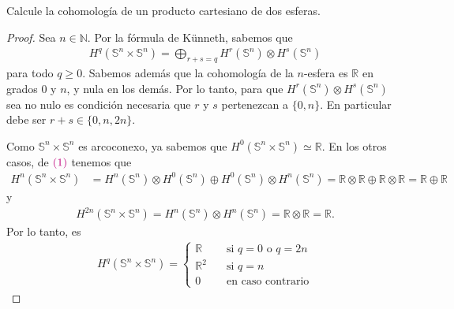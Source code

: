 \documentclass[11pt]{article}
\newcommand{\N}{\mathbb{N}}
\newcommand{\R}{\mathbb{R}}
\newcommand{\Ss}{\mathbb{S}}
\newcommand{\paint}[1]{\color{color}{#1}}
\newenvironment{exercise}[2][Ejercicio]{\begin{trivlist}
\item[\hskip \labelsep \paint{{\bfseries #1}}\hskip \labelsep {\bfseries #2.}]}{\end{trivlist}}
\begin{document}
\begin{exercise}{11 (d)} Calcule la cohomología de un producto cartesiano de dos esferas.
\begin{proof} Sea $n \in \N$. Por la fórmula de Künneth, sabemos que
\begin{align}
H^q(\Ss^n \times \Ss^n) = \bigoplus_{r+s = q} H^r(\Ss^n) \otimes H^s(\Ss^n)
\end{align}
para todo $q \geq 0$. Sabemos además que la cohomología de la $n$-esfera es $\R$ en grados $0$ y $n$, y nula en los demás. Por lo tanto, para que $H^r(\Ss^n) \otimes H^s(\Ss^n)$ sea no nulo es condición necesaria que $r$ y $s$ pertenezcan a $\{0,n\}$. En particular debe ser $r+s \in \{0,n,2n\}$. 

Como $\Ss^n \times  \Ss^n$ es arcoconexo, ya sabemos que $H^0(\Ss^n \times \Ss^n) \simeq \R$. En los otros casos, de $\paint{(1)}$ tenemos que
\begin{align*}
H^n(\Ss^n \times \Ss^n) &= H^n(\Ss^n) \otimes H^0(\Ss^n) \oplus H^0(\Ss^n) \otimes H^n(\Ss^n) = \R \otimes \R \oplus \R \otimes \R = \R \oplus \R
\end{align*}
y
\begin{align*}
H^{2n}(\Ss^n \times \Ss^n) = H^n(\Ss^n) \otimes H^n(\Ss^n) = \R \otimes \R = \R.
\end{align*}
Por lo tanto, es
\begin{align*}
H^q(\Ss^n \times \Ss^n) = \begin{cases}
\R \quad &\text{si $q = 0$ o $q = 2n$}\\
\R^2 \quad &\text{si $q = n$}\\
0 \quad &\text{en caso contrario}
\end{cases}
\end{align*}
\end{proof}
\end{exercise}
\end{document}
